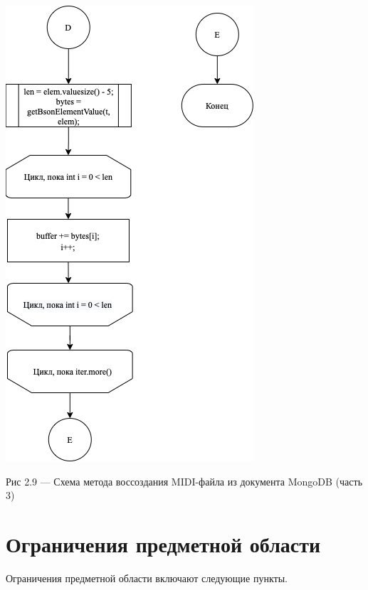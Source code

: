 \begin{center}
		\includegraphics[scale=0.7]{tex/img/FileBuilder3.png}
		
			Рис 2.9 — Схема метода воссоздания MIDI-файла из документа MongoDB (часть 3)
\end{center}

\section{Ограничения предметной области}

Ограничения предметной области включают следующие пункты.

